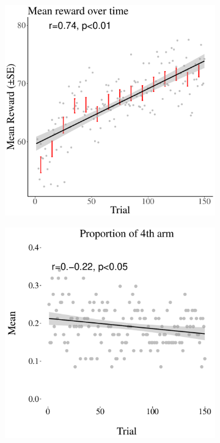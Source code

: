 \documentclass[a4paper,natbib]{apa6}
\begin{document}
\begin{figure}[ht]
\centering
\begin{subfigure}{.32\textwidth}
  \centering
\includegraphics[width=.95\textwidth]{meanovertime1.pdf}
\caption{}
\end{subfigure}
\begin{subfigure}{.32\textwidth}
  \centering
  \includegraphics[width=.95\textwidth]{figure23.pdf}

\end{subfigure}
\end{figure}
\end{document}
